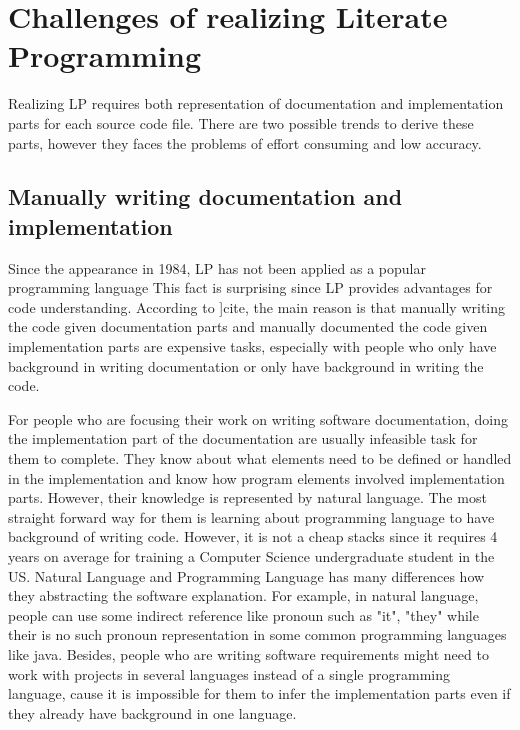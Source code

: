 \section{Challenges of realizing Literate Programming}
Realizing LP requires both representation of documentation and implementation parts for each source code file. There are two possible trends to derive these parts, however they faces the problems of effort consuming and low accuracy.
 
\subsection{Manually writing documentation and implementation}
Since the appearance in 1984, LP has not been applied as a popular programming language \cite{} This fact is surprising since LP provides advantages for code understanding. According to ]cite{}, the main reason is that manually writing the code given documentation parts and manually documented the code given implementation parts are expensive tasks, especially with people who only have background in writing documentation or only have background in writing the code. 

For people who are focusing their work on writing software documentation, doing the implementation part of the documentation are usually infeasible task for them to complete. They know about what elements need to be defined or handled in the implementation and know how program elements involved implementation parts. However, their knowledge is represented by natural language. The most straight forward way for them is learning about programming language to have background of writing code. However, it is not a cheap stacks since it requires 4 years on average for training a Computer Science undergraduate student in the US. Natural Language and Programming Language has many differences how they abstracting the software explanation. For example, in natural language, people can use some indirect reference like pronoun such as "it", "they" while their is no such pronoun representation in some common programming languages like java. Besides, people who are writing software requirements might need to work with projects in several languages instead of a single programming language, cause it is impossible for them to infer the implementation parts even if they already have background in one language.

